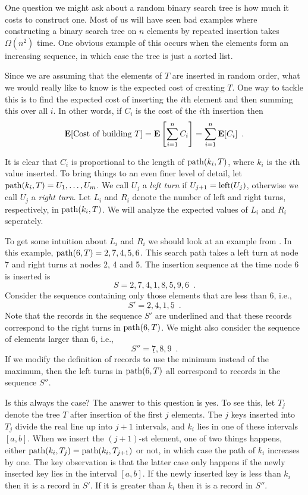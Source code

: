 One question we might ask about a random binary search tree is how
much it costs to construct one.  Most of us will have seen bad
examples where constructing a binary search tree on $n$ elements by
repeated insertion takes $\Omega(n^2)$ time.  One obvious example of
this occurs when the elements form an increasing sequence, in which
case the tree is just a sorted list.

Since we are assuming that the elements of $T$ are inserted in random
order, what we would really like to know is the expected cost of
creating $T$.  One way to tackle this is to find the expected cost of
inserting the $i$th element and then summing this over all $i$.  In
other words, if $C_i$ is the cost of the $i$th insertion then
\[
\mathbf{E}[\mbox{Cost of building $T$}] = \mathbf{E}\left[\sum_{i=1}^nC_i\right] 
	= \sum_{i=1}^n\mathbf{E}[C_i] \enspace .
\]

It is clear that $C_i$ is proportional to the length of
$\mathrm{path}(k_i,T)$, where $k_i$ is the $i$th value inserted.  To bring
things to an even finer level of detail, let
$\mathrm{path}(k_i,T)=U_1,\ldots,U_m$.  We call $U_j$ a \emph{left turn} if
$U_{j+1}=\mathrm{left}(U_j)$, otherwise we call $U_j$ a \emph{right turn}.  Let
$L_i$ and $R_i$ denote the number of left and right turns,
respectively, in $\mathrm{path}(k_i,T)$.  We will analyze the expected values
of $L_i$ and $R_i$ seperately.

To get some intuition about $L_i$ and $R_i$ we should look at an
example from .  In this example, $\mathrm{path}(6,T)=2, 7,
4, 5, 6$.  This search path takes a left turn at node 7 and right
turns at nodes 2, 4 and 5.  The insertion sequence at the time node 6
is inserted is
\[
	S = 2, 7, 4, 1, 8, 5, 9, 6 \enspace .
\]
Consider the sequence containing only those elements that are less
than 6, i.e.,
\[
	S' = \underline{2}, \underline{4}, 1, \underline{5}  \enspace .
\]
Note that the records in the sequence $S'$ are underlined and that
these records correspond to the right turns in $\mathrm{path}(6,T)$.  We might
also consider the sequence of elements larger than 6, i.e.,
\[
	S'' = \underline{7}, 8, 9 \enspace .
\]
If we modify the definition of records to use the minimum instead of
the maximum, then the left turns in $\mathrm{path}(6,T)$ all correspond to
records in the sequence $S''$.

Is this always the case?  The answer to this question is yes.  To see
this, let $T_j$ denote the tree $T$ after insertion of the first $j$
elements.  The $j$ keys inserted into $T_j$ divide the real line up
into $j+1$ intervals, and $k_i$ lies in one of these intervals
$[a,b]$.  When we insert the $(j+1)$-st element, one of two things
happens, either $\mathrm{path}(k_i,T_j)=\mathrm{path}(k_i,T_{j+1})$ or not, in which
case the path of $k_i$ increases by one.  The key observation is that
the latter case only happens if the newly inserted key lies in the
interval $[a,b]$.  If the newly inserted key is less than $k_i$ then
it is a record in $S'$.  If it is greater than $k_i$ then it is 
a record in $S''$.

